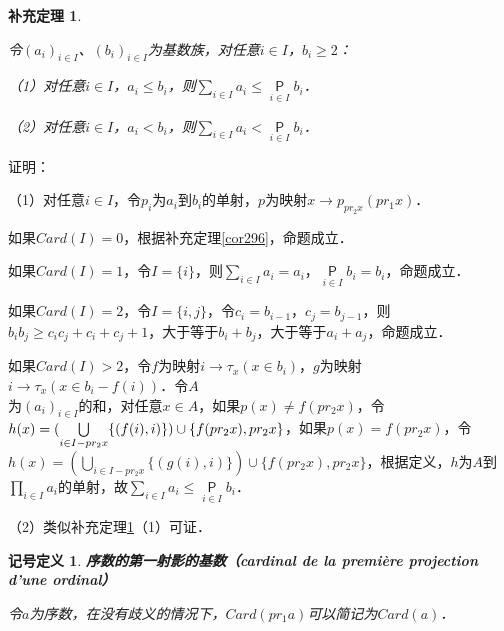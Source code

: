 \documentclass[12pt, a4paper, oneside]{book}
\newtheorem{sign}{记号定义}
\newtheorem{cor}{补充定理}
\begin{document}
			\begin{cor}\label{cor300}
				\hfill\par
				令$(a_i)_{i\in I}$、$(b_i)_{i\in I}$为基数族，对任意$i\in I$，$b_i\geq 2$：
				\par
				（1）对任意$i\in I$，$a_i\leq b_i$，则$\sum\limits_{i\in I}a_i\leq \mathop{\mathsf{P}}\limits_{i\in I}b_i$．
				\par
				（2）对任意$i\in I$，$a_i<b_i$，则$\sum\limits_{i\in I}a_i<\mathop{\mathsf{P}}\limits_{i\in I}b_i$．
			\end{cor}
			证明：
			\par
			（1）对任意$i\in I$，令$p_i$为$a_i$到$b_i$的单射，$p$为映射$x\to p_{pr_2x}(pr_1x)$．
			\par
			如果$Card(I)=0$，根据补充定理\ref{cor296}，命题成立．
			\par
			如果$Card(I)=1$，令$I=\{i\}$，则$\sum\limits_{i\in I}a_i=a_i$，$\mathop{\mathsf{P}}\limits_{i\in I}b_i=b_i$，命题成立．
			\par
			如果$Card(I)=2$，令$I=\{i, j\}$，令$c_i=b_{i-1}$，$c_j=b_{j-1}$，则$b_ib_j\geq c_ic_j+c_i+c_j+1$，大于等于$b_i+b_j$，大于等于$a_i+a_j$，命题成立．
			\par
			如果$Card(I)>2$，令$f$为映射$i\to \tau_x(x\in b_i)$，$g$为映射$i\to \tau_x(x\in b_i-f(i))$．令$A$\\为$(a_i)_{i\in I}$的和，对任意$x\in A$，如果$p(x)\neq f(pr_2x)$，令$h(x)=(\bigcup\limits_{i\in I-pr_2x}\{(f(i), i)\})\cup\\\{f(pr_2x), pr_2x\}$，如果$p(x)=f(pr_2x)$，令$h(x)=(\bigcup\limits_{i\in I-pr_2x}\{(g(i), i)\})\cup\{f(pr_2x), pr_2x\}$，根据定义，$h$为$A$到$\prod\limits_{i\in I}a_i$的单射，故$\sum\limits_{i\in I}a_i\leq\mathop{\mathsf{P}}\limits_{i\in I}b_i$．
			\par
			（2）类似补充定理\ref{cor300}（1）可证．

			\begin{sign}
				\textbf{序数的第一射影的基数（cardinal de la première projection d'une ordinal）}
				\par
				令$a$为序数，在没有歧义的情况下，$Card(pr_1a)$可以简记为$Card(a)$．
			\end{sign}
			
\end{document}
